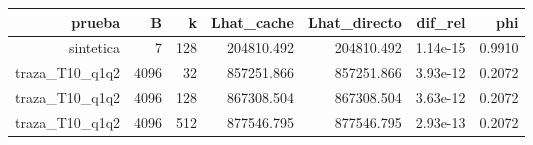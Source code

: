 \begin{tabular}{rrrrrrr}
\toprule
prueba & B & k & Lhat\_cache & Lhat\_directo & dif\_rel & phi \\
\midrule
sintetica & 7 & 128 & 204810.492 & 204810.492 & 1.14e-15 & 0.9910 \\
traza\_T10\_q1q2 & 4096 & 32 & 857251.866 & 857251.866 & 3.93e-12 & 0.2072 \\
traza\_T10\_q1q2 & 4096 & 128 & 867308.504 & 867308.504 & 3.63e-12 & 0.2072 \\
traza\_T10\_q1q2 & 4096 & 512 & 877546.795 & 877546.795 & 2.93e-13 & 0.2072 \\
\bottomrule
\end{tabular}
